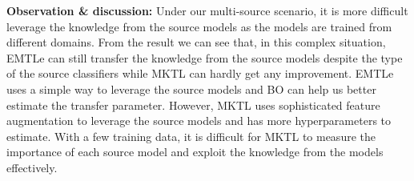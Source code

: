 \textbf{Observation \& discussion:} Under our multi-source scenario, it is more difficult leverage the knowledge from the source models as the models are trained from different domains. From the result we can see that, in this complex situation, EMTLe can still transfer the knowledge from the source models despite the type of the source classifiers while MKTL can hardly get any improvement. EMTLe uses a simple way to leverage the source models and BO can help us better estimate the transfer parameter. However, MKTL uses sophisticated feature augmentation to leverage the source models and has more hyperparameters to estimate. With a few training data, it is difficult for MKTL to measure the importance of each source model and exploit the knowledge from the models effectively.




